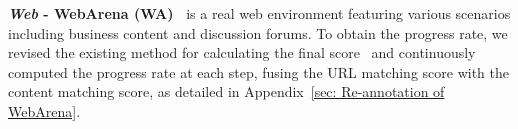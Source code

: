 \textbf{\textit{Web} - WebArena (WA)~\citep{zhou2023webarena}}
is a real web environment featuring various scenarios including business content and discussion forums. %
To obtain the progress rate, we revised the existing method for calculating the final score~\citep{zhou2023webarena} and continuously computed the progress rate at each step, fusing the URL matching score with the content matching score, 
as detailed in Appendix~\ref{sec: Re-annotation of WebArena}.



